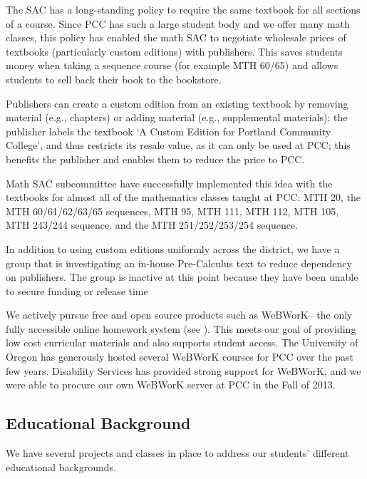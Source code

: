 The SAC has a long-standing policy to require the same textbook for all sections of a course. Since PCC has such a large student body and we offer many math classes, this policy has enabled the math SAC to negotiate wholesale prices of textbooks (particularly custom editions) with publishers.  This saves students money when taking a sequence course (for example MTH 60/65) and allows students to sell back their book to the bookstore.

Publishers can create a custom edition from an existing textbook by removing material (e.g., chapters) or adding material (e.g., supplemental materials); the publisher labels the textbook `A Custom Edition for Portland Community College', and thus restricts its resale value, as it can only be used at PCC; this benefits the publisher and enables them to reduce the price to PCC.  

Math SAC subcommittee have successfully implemented this idea with the textbooks for almost all of the mathematics classes taught at PCC: MTH 20, the MTH 60/61/62/63/65 sequences, MTH 95, MTH 111, MTH 112, MTH 105, MTH 243/244 sequence, and the MTH 251/252/253/254 sequence.

In addition to using custom editions uniformly across the district, we have a group that is investigating an in-house Pre-Calculus text to reduce dependency on publishers. The group is inactive at this point because they have been unable to secure funding or release time 

We actively pursue free and open source products such as WeBWorK-- the only fully accessible online homework system (see ). This meets our goal of providing low cost curricular materials and also supports student access. The University of Oregon has generously hosted several WeBWorK courses for PCC over the past few years.  Disability Services has provided strong support for WeBWorK, and we were able to procure our own WeBWorK server at PCC in the Fall of 2013.

\subsection{Educational Background}
We have several projects and classes in place to address our students' different educational backgrounds. 

